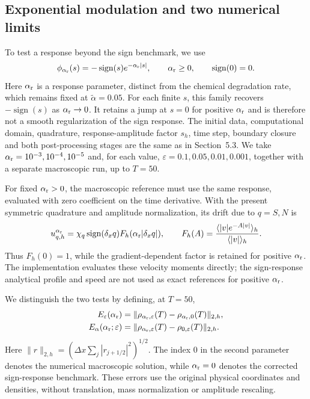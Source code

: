 \begin{revisionblock}
\subsection{Exponential modulation and two numerical limits}\label{sec:exponential-response}

To test a response beyond the sign benchmark, we use
\begin{equation}\label{eq:exponential-response}
\phi_{\alpha_{\rm r}}(s)=-\operatorname{sign}(s)e^{-\alpha_{\rm r}|s|},
\qquad \alpha_{\rm r}\ge0,\qquad \operatorname{sign}(0)=0.
\end{equation}
Here $\alpha_{\rm r}$ is a response parameter, distinct from the chemical degradation rate, which remains fixed at $\widetilde\alpha=0.05$.
For each finite $s$, this family recovers $-\operatorname{sign}(s)$ as $\alpha_{\rm r}\to0$. It retains a jump at $s=0$ for positive $\alpha_{\rm r}$ and is therefore not a smooth regularization of the sign response.
The initial data, computational domain, quadrature, response-amplitude factor $s_h$, time step, boundary closure and both post-processing stages are the same as in Section~5.3.
We take $\alpha_{\rm r}=10^{-3},10^{-4},10^{-5}$ and, for each value, $\varepsilon=0.1,0.05,0.01,0.001$, together with a separate macroscopic run, up to $T=50$.

For fixed $\alpha_{\rm r}>0$, the macroscopic reference must use the same response, evaluated with zero coefficient on the time derivative.
With the present symmetric quadrature and amplitude normalization, its drift due to $q=S,N$ is
\begin{equation}\label{eq:exponential-macro-drift}
u_{q,h}^{\alpha_{\rm r}}=\chi_q\operatorname{sign}(\delta_xq)F_h(\alpha_{\rm r}|\delta_xq|),
\qquad
F_h(A)=\frac{\langle |v|e^{-A|v|}\rangle_h}{\langle |v|\rangle_h}.
\end{equation}
Thus $F_h(0)=1$, while the gradient-dependent factor is retained for positive $\alpha_{\rm r}$.
The implementation evaluates these velocity moments directly; the sign-response analytical profile and speed are not used as exact references for positive $\alpha_{\rm r}$.

We distinguish the two tests by defining, at $T=50$,
\begin{align}
E_\varepsilon(\alpha_{\rm r})
&=\|\rho_{\alpha_{\rm r},\varepsilon}(T)-\rho_{\alpha_{\rm r},0}(T)\|_{2,h},\label{eq:exponential-epsilon-error}\\
E_\alpha(\alpha_{\rm r};\varepsilon)
&=\|\rho_{\alpha_{\rm r},\varepsilon}(T)-\rho_{0,\varepsilon}(T)\|_{2,h}.\label{eq:exponential-alpha-error}
\end{align}
Here $\|r\|_{2,h}=(\Delta x\sum_j|r_{j+1/2}|^2)^{1/2}$.
The index $0$ in the second parameter denotes the numerical macroscopic solution, while $\alpha_{\rm r}=0$ denotes the corrected sign-response benchmark.
These errors use the original physical coordinates and densities, without translation, mass normalization or amplitude rescaling.


\end{revisionblock}
